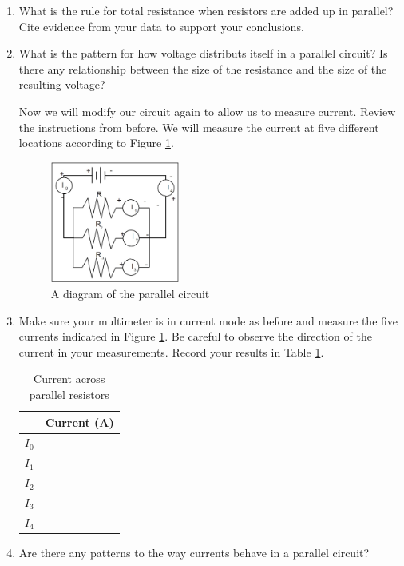 \begin{enumerate}
	\item What is the rule for total resistance when resistors are added up in parallel? Cite evidence from your data to support your conclusions.

	\item What is the pattern for how voltage distributs itself in a parallel circuit? Is there any relationship between the size of the resistance and the size of the resulting voltage?

\noindent Now we will modify our circuit again to allow us to measure current. Review the instructions from before. We will measure the current at five different locations according to Figure \ref{fig:parallelcurrent}.

\begin{figure}[h]
\centering
\includegraphics[width=0.4\textwidth]{./Exp2/pic/currentparallel.jpg}
\caption{A diagram of the parallel circuit}
\label{fig:parallelcurrent}
\end{figure}

	\item Make sure your multimeter is in current mode as before and measure the five currents indicated in Figure \ref{fig:parallelcurrent}. Be careful to observe the direction of the current in your measurements. Record your results in Table \ref{tab:parallelcurrent}.

	\begin{table}
	\begin{center}
	\begin{tabular}{| c | c |}
	\hline
		 & Current (A)\\
		\hline
		$I_0$ &\\
		\hline
		$I_1$ &\\
		\hline
		$I_2$ &\\
		\hline
		$I_3$ &\\
		\hline
		$I_4$ &\\
		\hline
	\end{tabular}
	\end{center}
	\caption{Current across parallel resistors}
	\label{tab:parallelcurrent}
	\end{table}

	\item Are there any patterns to the way currents behave in a parallel circuit?

\end{enumerate}
